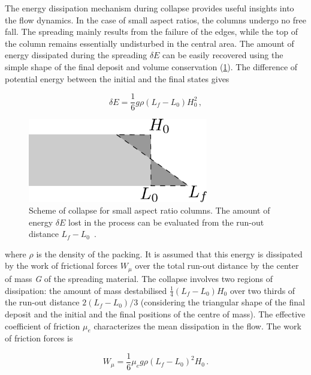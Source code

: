 The energy dissipation mechanism during collapse provides useful insights 
into the flow dynamics. In the case of small aspect ratios, the columns undergo 
no free fall. The spreading mainly results from the failure of the edges, while 
the top of the column remains essentially undisturbed in the central area. 
The amount of energy dissipated during the 
spreading $\delta E$ can be easily recovered using the simple shape of the 
final deposit and volume conservation (\cref{fig:volume_conservation}). The 
difference of potential energy between the initial and the final states gives

\begin{equation}
\delta E = \frac{1}{6} g \rho (L_f - L_0) H_0^2 \,,
\end{equation}

\begin{figure}
\centering
\includegraphics[width=0.7\textwidth]{volume_conservation}
\caption[Scheme of collapse for small aspect ratio columns.]{Scheme of collapse 
for small aspect ratio columns. The amount of 
energy $\delta E$ lost in the process can be evaluated
from the run-out distance $L_f - L_0$~\citep{Staron2007a}.}
\label{fig:volume_conservation}
\end{figure}

where $\rho$ is the density of the packing. It is assumed that this energy is 
dissipated by the work of frictional forces $W_{\mu}$ over the total run-out 
distance by the center of mass \textit{G} of the spreading 
material. The collapse involves two regions of dissipation: the amount of mass 
destabilised $\frac{1}{4}(L_f - 
L_0) H_0$ over two thirds of the run-out distance $2(L_f - L_0) / 3$ 
(considering
the triangular shape of the final deposit and the initial and the final 
positions of the centre of mass). The effective coefficient of friction $\mu_e$ 
characterizes the mean dissipation in the flow. The work of friction forces is 

\begin{equation}
W_{\mu} = \frac{1}{6} \mu_e g \rho (L_f - L_0)^2 H_0 \,.
\end{equation}

